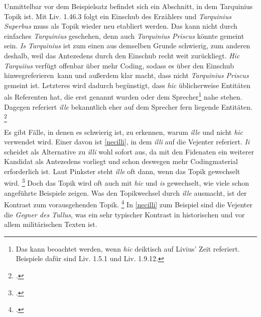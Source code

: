 \documentclass[12pt]{article}
\newcommand{\lat}[1]{\textit{#1}} %
\begin{document}
Unmittelbar vor dem Beispielsatz befindet sich ein Abschnitt, in dem Tarquinius Topik ist.
Mit Liv. 1.46.3 folgt ein Einschub des Erzählers und \lat{Tarquinius Superbus} muss als Topik wieder neu etabliert werden. Das kann nicht durch einfaches \lat{Tarquinius} geschehen, denn auch \lat{Tarquinius Priscus} könnte gemeint sein. \lat{Is Tarquinius} ist zum einen aus demselben Grunde schwierig, zum anderen deshalb, weil das Antezedens durch den Einschub recht weit zurückliegt.
\lat{Hic Tarquiius} verfügt offenbar über mehr Coding, sodass es über den Einschub \glqq hinwegreferieren\grqq\ kann und außerdem klar macht, dass nicht \lat{Tarquinius Priscus} gemeint ist.
Letzteres wird dadurch begünstigt, dass \lat{hic} üblicherweise Entitäten als Referenten hat, die erst genannt wurden oder dem Sprecher\footnote{Das kann beoachtet werden, wenn \lat{hic} deiktisch auf Livius' Zeit referiert. Beispiele dafür sind Liv. 1.5.1 und Liv. 1.9.12.}
nahe stehen. Dagegen referiert \lat{ille} bekanntlich eher auf dem Sprecher fern liegende Entitäten.
\footcite[Vgl.][§\,118, Punkt 2.]{kuehner}

\begin{comment}
Oft sind diese Nähe und diese Ferne gedanklich oder räumlich und damit außertextlich. Natürlich können aber auch -- vor allem bei der typischen Gegenüberstellung von \lat{hic} und \lat{ille} -- Nähe und Ferne im Diskurs gemeint sein, was in \ref{hiilli} der Fall ist.

\ex.
\label{hiilli}
\lat{Tum Sabinae mulieres} [\ldots] \lat{se inter tela volantia inferre,} [\ldots] \lat{dirimere iras, hinc patres$_i$, hinc viros$_j$ orantes,} [\ldots] \lat{ne parricidio macularent partus suos, nepotum illi$_j$, hi$_i$ liberum progeniem.} (Liv. 1.13.1f.)
\trans Dann warfen sich die sabinischen Frauen zwischen die fliegenden Geschosse, trennten die Erzürnten und baten auf der einen Seite ihre Väter, auf der anderen ihre Männer, nicht durch Verwandtenmord ihre Nachkommen -- jene ihre Enkel, diese ihre Kinder -- zu beflecken.

\end{comment}

Es gibt Fälle, in denen es schwierig ist, zu erkennen, warum \lat{ille} und nicht \lat{hic} verwendet wird. Einer davon ist \ref{necilli}, in dem \lat{illi} auf die Vejenter referiert.
\lat{Ii} scheidet als Alternative zu \lat{illi} wohl sofort aus, da mit den Fidenaten ein weiterer Kandidat als Antezedens vorliegt und schon deswegen mehr Codingmaterial erforderlich ist.
Laut Pinkster steht \lat{ille} oft dann, wenn das Topik gewechselt wird.
\footcite[hier S.\,377]{pinkster87}
Doch das Topik wird oft auch mit \lat{hic} und \lat{is} gewechselt, wie viele schon angeführte Beispiele zeigen.
Was den Topikwechsel durch \lat{ille} ausmacht, ist der Kontrast zum vorausgehenden Topik.
\footcite[S.\,90]{spevak}
In \ref{necilli} zum Beispiel sind die Vejenter die \emph{Gegner des Tullus}, was ein sehr typischer Kontrast in historischen und vor allem militärischen Texten ist.
\end{document}
